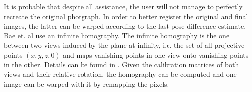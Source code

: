 It is probable that despite all assistance, the user will not manage to
perfectly recreate the original photgraph.  In order to better register the
original and final images, the latter can be warped according to the last pose
difference estimate. Bae et. al use an infinite homography. The infinite
homography is the one between two views induced by the plane at infinity, i.e.
the set of all projective points $(x,y,z,0)$ and maps vanishing points in one
view onto vanishing points in the other. Details can be found in \citep[ch.
13.4]{h&z2004}. Given the calibration matrices of both views and their relative
   rotation, the homography can be computed and one image can be warped with it
   by remapping the pixels.

